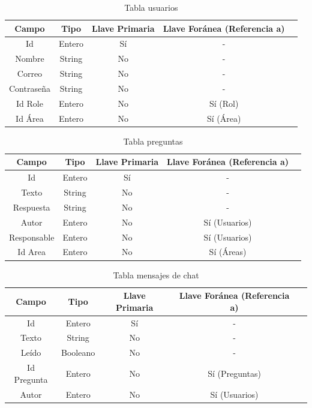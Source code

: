 \begin{table}[h]
	\begin{tabular}{| c | c | c | c | c |}
		\hline
		Campo & Tipo & Llave Primaria & Llave Foránea (Referencia a) \\ \hline
		Id & Entero & Sí & -  \\ \hline 
		Nombre & String & No & - \\ \hline
		Correo & String & No & - \\ \hline
		Contraseña & String & No & - \\ \hline
		Id Role & Entero & No & Sí (Rol) \\ \hline
		Id Área & Entero & No & Sí (Área) \\ \hline
	\end{tabular}
	\caption{Tabla usuarios}
	\label{table:users}
\end{table}

\begin{table}[h]
	\begin{tabular}{| c | c | c | c | c |}
		\hline
		Campo & Tipo & Llave Primaria & Llave Foránea (Referencia a) \\ \hline
		Id & Entero & Sí & -  \\ \hline 
		Texto & String & No & - \\ \hline
		Respuesta & String & No & - \\ \hline
		Autor & Entero & No & Sí (Usuarios) \\ \hline
		Responsable & Entero & No & Sí (Usuarios) \\ \hline
		Id Area & Entero & No & Sí (Áreas) \\ \hline
	\end{tabular}
	\caption{Tabla preguntas}
	\label{table:questions}
\end{table}

\begin{table}[h]
	\begin{tabular}{| c | c | c | c | c |}
		\hline
		Campo & Tipo & Llave Primaria & Llave Foránea (Referencia a) \\ \hline
		Id & Entero & Sí & -  \\ \hline 
		Texto & String & No & - \\ \hline
		Leído & Booleano & No & - \\ \hline
		Id Pregunta & Entero & No & Sí (Preguntas) \\ \hline
		Autor & Entero & No & Sí (Usuarios) \\ \hline
	\end{tabular}
	\caption{Tabla mensajes de chat}
	\label{table:chat}
\end{table}



